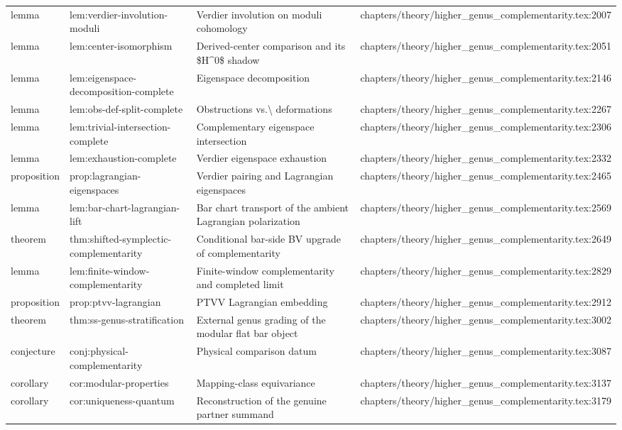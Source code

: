 \documentclass[11pt]{article}
\begin{document}
\begin{longtable}{L{0.10\textwidth}L{0.26\textwidth}L{0.42\textwidth}L{0.22\textwidth}}
lemma & lem:verdier-involution-moduli & Verdier involution on moduli cohomology & chapters/theory/higher\_genus\_complementarity.tex:2007\\
lemma & lem:center-isomorphism & Derived-center comparison and its \$H\textasciicircum{}0\$ shadow & chapters/theory/higher\_genus\_complementarity.tex:2051\\
lemma & lem:eigenspace-decomposition-complete & Eigenspace decomposition & chapters/theory/higher\_genus\_complementarity.tex:2146\\
lemma & lem:obs-def-split-complete & Obstructions vs.\textbackslash{} deformations & chapters/theory/higher\_genus\_complementarity.tex:2267\\
lemma & lem:trivial-intersection-complete & Complementary eigenspace intersection & chapters/theory/higher\_genus\_complementarity.tex:2306\\
lemma & lem:exhaustion-complete & Verdier eigenspace exhaustion & chapters/theory/higher\_genus\_complementarity.tex:2332\\
proposition & prop:lagrangian-eigenspaces & Verdier pairing and Lagrangian eigenspaces & chapters/theory/higher\_genus\_complementarity.tex:2465\\
lemma & lem:bar-chart-lagrangian-lift & Bar chart transport of the ambient Lagrangian polarization & chapters/theory/higher\_genus\_complementarity.tex:2569\\
theorem & thm:shifted-symplectic-complementarity & Cond{}itional bar-side BV upgrade of complementarity & chapters/theory/higher\_genus\_complementarity.tex:2649\\
lemma & lem:finite-window-complementarity & Finite-window complementarity and completed limit & chapters/theory/higher\_genus\_complementarity.tex:2829\\
proposition & prop:ptvv-lagrangian & PTVV Lagrangian embedding & chapters/theory/higher\_genus\_complementarity.tex:2912\\
theorem & thm:ss-genus-stratification & External genus grading of the modular flat bar object & chapters/theory/higher\_genus\_complementarity.tex:3002\\
conjecture & conj:physical-complementarity & Physical comparison datum & chapters/theory/higher\_genus\_complementarity.tex:3087\\
corollary & cor:modular-properties & Mapping-class equivariance & chapters/theory/higher\_genus\_complementarity.tex:3137\\
corollary & cor:uniqueness-quantum & Reconstruction of the genuine partner summand & chapters/theory/higher\_genus\_complementarity.tex:3179\\

\end{longtable}
\end{document}
